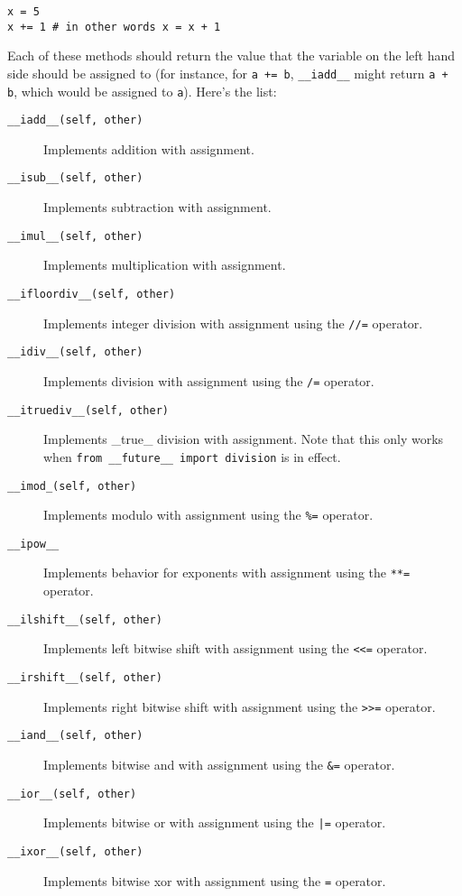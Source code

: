 \documentclass[a4paper,11pt]{article}
\newcommand{\code}[1]{\texttt{#1}}
\begin{document}
\begin{lstlisting}
x = 5
x += 1 # in other words x = x + 1
\end{lstlisting}

Each of these methods should return the value that the variable on the left hand side should be assigned to (for instance, for \code{a += b}, \code{__iadd__} might return \code{a + b}, which would be assigned to \code{a}). Here's the list:

\begin{description}

\item[\code{__iadd__(self, other)}]
Implements addition with assignment.
\item[\code{__isub__(self, other)}]
Implements subtraction with assignment.
\item[\code{__imul__(self, other)}]
Implements multiplication with assignment.
\item[\code{__ifloordiv__(self, other)}]
Implements integer division with assignment using the \code{//=} operator.
\item[\code{__idiv__(self, other)}]
Implements division with assignment using the \code{/=} operator.
\item[\code{__itruediv__(self, other)}]
Implements _true_ division with assignment. Note that this only works when \code{from __future__ import division} is in effect.
\item[\code{__imod_(self, other)}]
Implements modulo with assignment using the \code{\%=} operator.
\item[\code{__ipow__}]
Implements behavior for exponents with assignment using the \code{**=} operator.
\item[\code{__ilshift__(self, other)}]
Implements left bitwise shift with assignment using the \code{<<=} operator.
\item[\code{__irshift__(self, other)}]
Implements right bitwise shift with assignment using the \code{>>=} operator.
\item[\code{__iand__(self, other)}]
Implements bitwise and with assignment using the \code{\&=} operator.
\item[\code{__ior__(self, other)}]
Implements bitwise or with assignment using the \code{|=} operator.
\item[\code{__ixor__(self, other)}]
Implements bitwise xor with assignment using the \code{=} operator.

\end{description}
\end{document}
